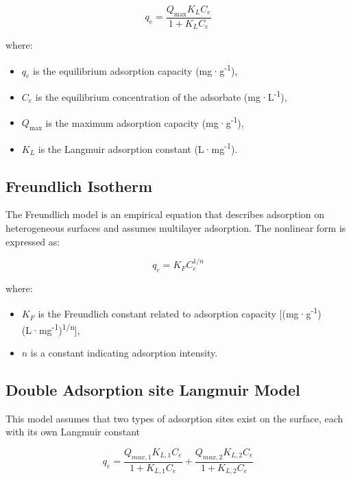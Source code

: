 \documentclass[journal=jacsat,manuscript=article]{achemso}
\begin{document}
\begin{equation}
q_e = \frac{Q_\text{max} K_L C_e}{1 + K_L C_e}
\label{eq:langmuir_nonlin}
\end{equation}

where:
\begin{itemize}
  \item \( q_e \) is the equilibrium adsorption capacity (mg·g\textsuperscript{-1}),
  \item \( C_e \) is the equilibrium concentration of the adsorbate (mg·L\textsuperscript{-1}),
  \item \( Q_\text{max} \) is the maximum adsorption capacity (mg·g\textsuperscript{-1}),
  \item \( K_L \) is the Langmuir adsorption constant (L·mg\textsuperscript{-1}).
\end{itemize}

\subsection{Freundlich Isotherm}

The Freundlich model is an empirical equation that describes adsorption on heterogeneous surfaces and assumes multilayer adsorption. The nonlinear form is expressed as:

\begin{equation}
q_e = K_F C_e^{1/n}
\label{eq:freundlich_nonlin}
\end{equation}

where:
\begin{itemize}
  \item \( K_F \) is the Freundlich constant related to adsorption capacity [(mg·g\textsuperscript{-1})(L·mg\textsuperscript{-1})\textsuperscript{1/n}],
  \item \( n \) is a constant indicating adsorption intensity.
\end{itemize}

\subsection{Double Adsorption site Langmuir Model}
This model assumes that two types of adsorption sites exist on the surface, each with its own Langmuir constant

\begin{equation}
q_e = \frac{Q_{max,1} K_{L,1} C_e}{1 + K_{L,1} C_e} + \frac{Q_{max,2} K_{L,2} C_e}{1 + K_{L,2} C_e}
\label{eq:DL_nonlin}
\end{equation}
\end{document}
